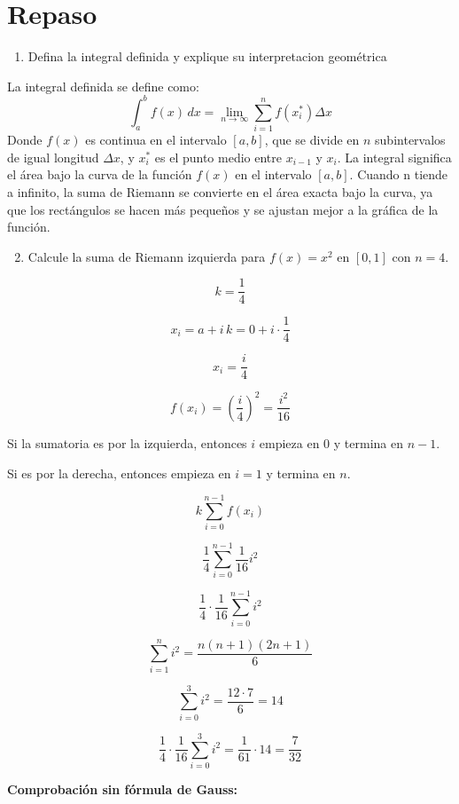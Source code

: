 \section{Repaso}

\begin{enumerate}
    \item Defina la integral definida y explique su interpretacion geométrica
\end{enumerate}

La integral definida se define como:
\[
\int_{a}^{b} f(x) \,dx = \lim_{n \to \infty} \sum_{i=1}^{n} f(x_i^*) \Delta x
\]
Donde $f(x)$ es continua en el intervalo \([a,b]\), que se divide en \(n\) subintervalos de igual longitud \(\Delta x\), y \(x_i^*\) es el punto medio entre \(x_{i-1}\) y \(x_i\).
La integral significa el área bajo la curva de la función \(f(x)\) en el intervalo \([a,b]\). Cuando n tiende a infinito, la suma de Riemann se convierte en el área exacta bajo la curva, ya que los rectángulos se hacen más pequeños y se ajustan mejor a la gráfica de la función.

\begin{enumerate}
    \setcounter{enumi}{1}
    \item Calcule la suma de Riemann izquierda para \( f(x) = x^2 \) en \([0,1]\) con \(n = 4\).
\end{enumerate}

\[
k = \frac{1}{4}
\]

\[
x_i = a + i\,k 
    = 0 + i \cdot \frac{1}{4} 
\]

\[
x_i = \frac{i}{4}
\]

\[
f(x_i) = \left(\frac{i}{4}\right)^2 
       = \frac{i^2}{16}
\]

Si la sumatoria es por la izquierda, entonces \(i\) empieza en \(0\) y termina en \(n - 1\). 

Si es por la derecha, entonces empieza en \(i = 1\) y termina en \(n\).

\[
k \sum_{i=0}^{n-1} f(x_i)
\]

\[
\frac{1}{4} \sum_{i=0}^{n-1} \frac{1}{16} i^2
\]

\[
\frac{1}{4} \cdot \frac{1}{16} \sum_{i=0}^{n-1} i^2
\]

\[
\sum_{i=1}^{n} i^2 = \frac{n(n+1)(2n+1)}{6}
\]

\[
\sum_{i=0}^{3} i^2 = \frac{12 \cdot 7}{6} = 14
\]

\[
\frac{1}{4} \cdot \frac{1}{16} \sum_{i=0}^{3} i^2 = \frac{1}{61} \cdot 14 = \frac{7}{32}
\]

\textbf{Comprobación sin fórmula de Gauss:}

